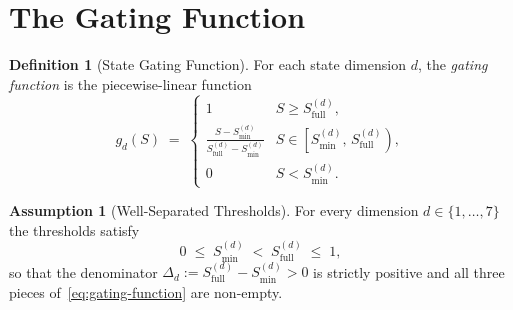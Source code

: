 \documentclass[12pt,openany]{book}
\numberwithin{equation}{chapter}
\theoremstyle{plain}
\theoremstyle{definition}
\newtheorem{definition}[theorem]{Definition}
\newtheorem{assumption}[theorem]{Assumption}
\theoremstyle{remark}
\def\mathcal#1{#1}%
\begin{document}
\section{The Gating Function}

\begin{definition}[State Gating Function]
\label{def:gating-function}
For each state dimension $d$, the \emph{gating function} is the
piecewise-linear function
\begin{equation}
  g_d(\mathcal{S}) \;=\; \begin{cases}
    1 & \mathcal{S} \geq \mathcal{S}_{\mathrm{full}}^{(d)}, \\[4pt]
    \displaystyle\frac{\mathcal{S} -
      \mathcal{S}_{\min}^{(d)}}{\mathcal{S}_{\mathrm{full}}^{(d)}
      - \mathcal{S}_{\min}^{(d)}} &
      \mathcal{S} \in \left[\mathcal{S}_{\min}^{(d)},\,
      \mathcal{S}_{\mathrm{full}}^{(d)}\right), \\[4pt]
    0 & \mathcal{S} < \mathcal{S}_{\min}^{(d)}.
  \end{cases}
  \label{eq:gating-function}
\end{equation}
\end{definition}

\begin{assumption}[Well-Separated Thresholds]
\label{ass:thresholds}
For every dimension $d \in \{1,\ldots,7\}$ the thresholds satisfy
\begin{equation}
  0 \;\leq\; \mathcal{S}_{\min}^{(d)}
    \;<\; \mathcal{S}_{\mathrm{full}}^{(d)}
    \;\leq\; 1,
  \label{eq:threshold-assumption}
\end{equation}
so that the denominator
$\Delta_d := \mathcal{S}_{\mathrm{full}}^{(d)} - \mathcal{S}_{\min}^{(d)} > 0$
is strictly positive and all three pieces of~\eqref{eq:gating-function}
are non-empty.
\end{assumption}
\end{document}
